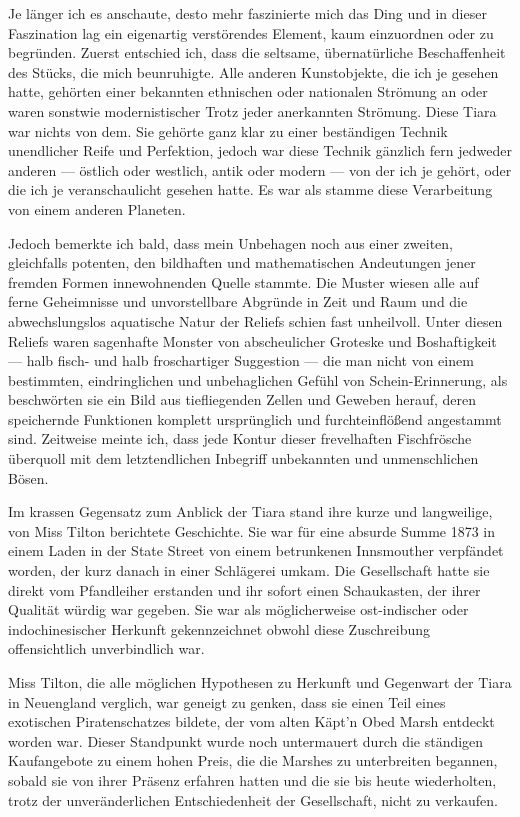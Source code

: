 Je länger ich es anschaute, desto mehr faszinierte mich das Ding und in dieser Faszination lag ein eigenartig verstörendes Element, kaum einzuordnen oder zu begründen. Zuerst entschied ich, dass die seltsame, übernatürliche Beschaffenheit des Stücks, die mich beunruhigte. Alle anderen Kunstobjekte, die ich je gesehen hatte, gehörten einer bekannten ethnischen oder nationalen Strömung an oder waren sonstwie modernistischer Trotz jeder anerkannten Strömung. Diese Tiara war nichts von dem. Sie gehörte ganz klar zu einer beständigen Technik unendlicher Reife und Perfektion, jedoch war diese Technik gänzlich fern jedweder anderen --- östlich oder westlich, antik oder modern --- von der ich je gehört, oder die ich je veranschaulicht gesehen hatte. Es war als stamme diese Verarbeitung von einem anderen Planeten.

Jedoch bemerkte ich bald, dass mein Unbehagen noch aus einer zweiten, gleichfalls potenten, den bildhaften und mathematischen Andeutungen jener fremden Formen innewohnenden Quelle stammte. Die Muster wiesen alle auf ferne Geheimnisse und unvorstellbare Abgründe in Zeit und Raum und die abwechslungslos aquatische Natur der Reliefs schien fast unheilvoll. Unter diesen Reliefs waren sagenhafte Monster von abscheulicher Groteske und Boshaftigkeit --- halb fisch- und halb froschartiger Suggestion --- die man nicht von einem bestimmten, eindringlichen und unbehaglichen Gefühl von Schein-Erinnerung, als beschwörten sie ein Bild aus tiefliegenden Zellen und Geweben herauf, deren speichernde Funktionen komplett ursprünglich und furchteinflößend angestammt sind. Zeitweise meinte ich, dass jede Kontur dieser frevelhaften Fischfrösche überquoll mit dem letztendlichen Inbegriff unbekannten und unmenschlichen Bösen.

Im krassen Gegensatz zum Anblick der Tiara stand ihre kurze und langweilige, von Miss Tilton berichtete Geschichte. Sie war für eine absurde Summe 1873 in einem Laden in der State Street von einem betrunkenen Innsmouther verpfändet worden, der kurz danach in einer Schlägerei umkam. Die Gesellschaft hatte sie direkt vom Pfandleiher erstanden und ihr sofort einen Schaukasten, der ihrer Qualität würdig war gegeben. Sie war als möglicherweise ost-indischer oder indochinesischer Herkunft gekennzeichnet obwohl diese Zuschreibung offensichtlich unverbindlich war.

Miss Tilton, die alle möglichen Hypothesen zu Herkunft und Gegenwart der Tiara in Neuengland verglich, war geneigt zu genken, dass sie einen Teil eines exotischen Piratenschatzes bildete, der vom alten Käpt'n Obed Marsh entdeckt worden war. Dieser Standpunkt wurde noch untermauert durch die ständigen Kaufangebote zu einem hohen Preis, die die Marshes zu unterbreiten begannen, sobald sie von ihrer Präsenz erfahren hatten und die sie bis heute wiederholten, trotz der unveränderlichen Entschiedenheit der Gesellschaft, nicht zu verkaufen.

